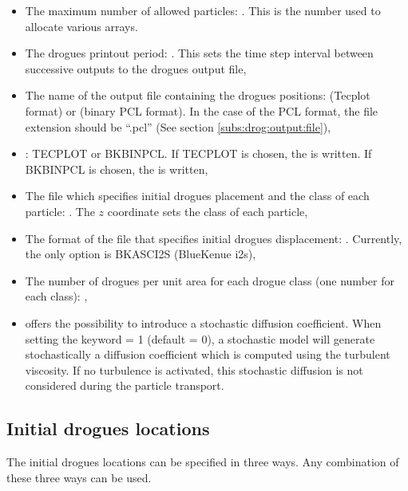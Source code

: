 \begin{itemize}
\item The maximum number of allowed particles:
.
This is the number used to allocate various arrays.

\item The drogues printout period: .
This sets the time step interval between successive outputs to the
drogues output file,

\item The name of the output file containing the drogues positions:
 (Tecplot format)
or  (binary PCL format).
In the case of the PCL format, the file extension should be “.pcl”
(See section \ref{subs:drog:output:file}),

\item {}: TECPLOT or BKBINPCL.
If TECPLOT is chosen, the  is written.
If BKBINPCL is chosen, the  is written,

\item The file which specifies initial drogues placement
and the class of each particle:
.
The $z$ coordinate sets the class of each particle,

\item The format of the file that specifies initial drogues displacement:
.
Currently, the only option is BKASCI2S (BlueKenue i2s),

\item The number of drogues per unit area for each drogue class
(one number for each class): ,

\item {} offers the possibility to introduce a stochastic diffusion
coefficient.
When setting the keyword  = 1 (default = 0),
a stochastic model will generate stochastically a diffusion coefficient
which is computed using the turbulent viscosity.
If no turbulence is activated, this stochastic diffusion is not considered
during the particle transport.
\end{itemize}

\subsection{Initial drogues locations}
\label{subs:drog:init}
The initial drogues locations can be specified in three ways.
Any combination of these three ways can be used.

